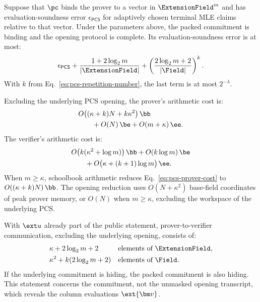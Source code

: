 \begin{proposition}
\label{proposition:packed-pcs}
Suppose that \(\pc\) binds the prover to a vector in
\(\ExtensionField^m\) and has evaluation-soundness error
\(\epsilon_{\mathsf{PCS}}\) for adaptively chosen terminal MLE
claims relative to that vector.
Under the parameters above, the packed commitment is binding and
the opening protocol is complete.
Its evaluation-soundness error is at most:
\begin{equation}
    \epsilon_{\mathsf{PCS}}
    +\frac{1+2\log_2m}{|\ExtensionField|}
    +\left(\frac{2\log_2m+2}{|\Field|}\right)^k.
\label{eq:pcs-soundness}
\end{equation}
With \(k\) from Eq.~\eqref{eq:pcs-repetition-number}, the last term
is at most \(2^{-\lambda}\).

Excluding the underlying PCS opening, the prover's arithmetic cost is:
\begin{equation}
\begin{aligned}
    &O\bigl((\kappa+k)N+k\kappa^2\bigr)\,\bb\\
    &\qquad{}+O(N)\,\be+O(m+\kappa)\,\ee.
\end{aligned}
\label{eq:pcs-prover-cost}
\end{equation}
The verifier's arithmetic cost is:
\begin{equation}
\begin{aligned}
    &O\bigl(k(\kappa^2+\log m)\bigr)\,\bb
       +O(k\log m)\,\be\\
    &\qquad{}+O\bigl(\kappa+(k+1)\log m\bigr)\,\ee.
\end{aligned}
\label{eq:pcs-verifier-cost}
\end{equation}
When \(m\geq\kappa\), schoolbook arithmetic reduces
Eq.~\eqref{eq:pcs-prover-cost} to
\(O((\kappa+k)N)\,\bb\).
The opening reduction uses \(O(N+\kappa^2)\) base-field coordinates
of peak prover memory, or \(O(N)\) when \(m\geq\kappa\), excluding
the workspace of the underlying PCS.

With \(\ext u\) already part of the public statement, prover-to-verifier
communication, excluding the underlying opening, consists of:
\[
\begin{aligned}
    &\kappa+2\log_2m+2
        &&\text{elements of }\ExtensionField,\\
    &\kappa^2+k(2\log_2m+2)
        &&\text{elements of }\Field.
\end{aligned}
\]
If the underlying commitment is hiding, the packed commitment is also
hiding. This statement concerns the commitment, not the unmasked
opening transcript, which reveals the column evaluations
\(\ext{\bm v}\).
\end{proposition}

